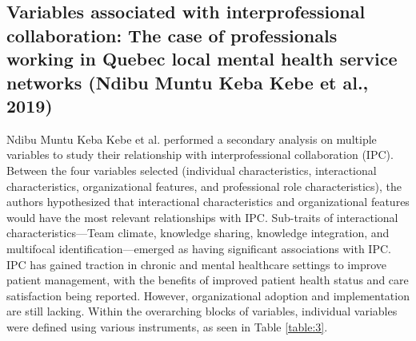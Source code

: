 \documentclass[sn-nature]{sn-jnl}%
\theoremstyle{thmstyleone}%
\theoremstyle{thmstyletwo}%
\theoremstyle{thmstylethree}%
\begin{document}
\subsection{Variables associated with interprofessional collaboration: The case of professionals working in Quebec local mental health service networks (Ndibu Muntu Keba Kebe et al., 2019)\cite{ndibu_muntu_keba_kebe_variables_2019}}
Ndibu Muntu Keba Kebe et al. performed a secondary analysis on multiple variables to study their relationship with interprofessional collaboration (IPC). Between the four variables selected (individual characteristics, interactional characteristics, organizational features, and professional role characteristics), the authors hypothesized that interactional characteristics and organizational features would have the most relevant relationships with IPC. Sub-traits of interactional characteristics—Team climate, knowledge sharing, knowledge integration, and multifocal identification—emerged as having significant associations with IPC\cite{ndibu_muntu_keba_kebe_variables_2019}.
IPC has gained traction in chronic and mental healthcare settings to improve patient management, with the benefits of improved patient health status and care satisfaction being reported. However, organizational adoption and implementation are still lacking. Within the overarching blocks of variables, individual variables were defined using various instruments, as seen in Table \ref{table:3}.
\end{document}
